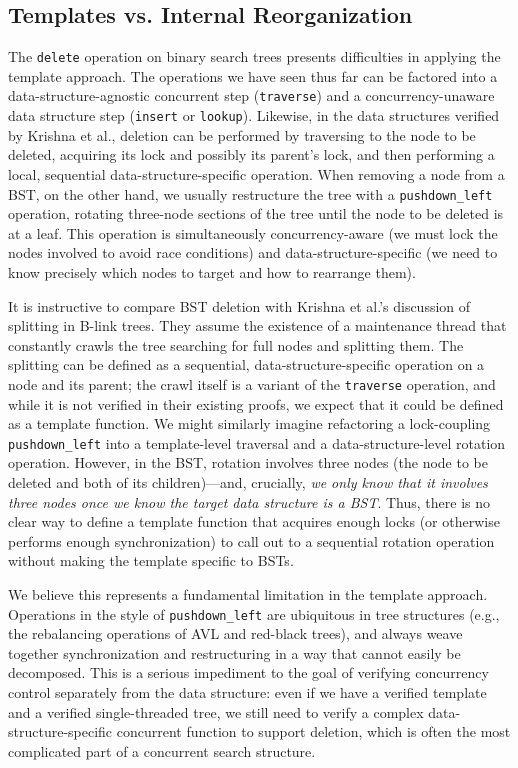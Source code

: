 \documentclass[a4paper,UKenglish,cleveref, autoref, thm-restate]{lipics-v2021}
\begin{document}
\subsection{Templates vs. Internal Reorganization}
\label{internal_reorganize}
The \lstinline{delete} operation on binary search trees presents difficulties in applying the template approach. The operations we have seen thus far can be factored into a data-structure-agnostic concurrent step (\lstinline{traverse}) and a concurrency-unaware data structure step (\lstinline{insert} or \lstinline{lookup}). Likewise, in the data structures verified by Krishna et al., deletion can be performed by traversing to the node to be deleted, acquiring its lock and possibly its parent's lock, and then performing a local, sequential data-structure-specific operation. When removing a node from a BST, on the other hand, we usually restructure the tree with a \lstinline{pushdown_left} operation, %
rotating three-node sections of the tree until the node to be deleted is at a leaf. This operation is simultaneously concurrency-aware (we must lock the nodes involved to avoid race conditions) and data-structure-specific (we need to know precisely which nodes to target and how to rearrange them).

It is instructive to compare BST deletion with Krishna et al.'s discussion of splitting in B-link trees. They assume the existence of a maintenance thread that constantly crawls the tree searching for full nodes and splitting them. The splitting can be defined as a sequential, data-structure-specific operation on a node and its parent; the crawl itself is a variant of the \lstinline{traverse} operation, and while it is not verified in their existing proofs, we expect that it could be defined as a template function. We might similarly imagine refactoring a lock-coupling \lstinline{pushdown_left} into a template-level traversal and a data-structure-level rotation operation. However, in the BST, rotation involves three nodes (the node to be deleted and both of its children)---and, crucially, \emph{we only know that it involves three nodes once we know the target data structure is a BST}. Thus, there is no clear way to define a template function that acquires enough locks (or otherwise performs enough synchronization) to call out to a sequential rotation operation without making the template specific to BSTs.

We believe this represents a fundamental limitation in the template approach. Operations in the style of \lstinline{pushdown_left} are ubiquitous in tree structures (e.g., the rebalancing operations of AVL and red-black trees), and always weave together synchronization and restructuring in a way that cannot easily be decomposed. This is a serious impediment to the goal of verifying concurrency control separately from the data structure: even if we have a verified template and a verified single-threaded tree, we still need to verify a complex data-structure-specific concurrent function to support deletion, which is often the most complicated part of a concurrent search structure.
\end{document}
